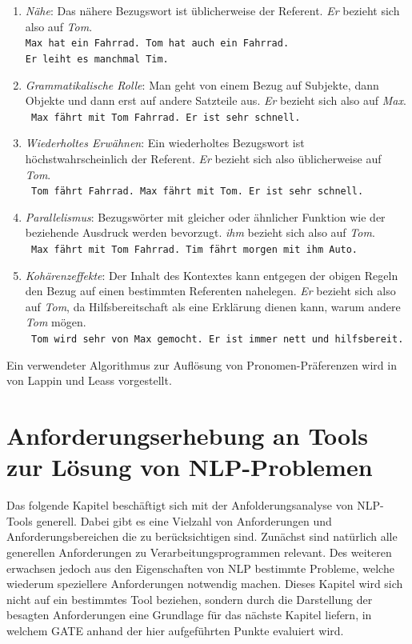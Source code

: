 \documentclass[12pt]{report}
\begin{document}
\begin{enumerate}
\item \textit{Nähe}: Das nähere Bezugswort ist üblicherweise der Referent. \textit{\glqq  Er\grqq{}} bezieht sich also auf \textit{Tom}.\\
\tt Max hat ein Fahrrad. Tom hat auch ein Fahrrad. \\Er leiht es manchmal Tim.
\rm
\item \textit{Grammatikalische Rolle}: Man geht von einem Bezug auf Subjekte, dann Objekte und dann erst auf andere Satzteile aus. \textit{\glqq  Er\grqq{}} bezieht sich also auf \textit{Max}.\\
\tt
Max fährt mit Tom Fahrrad. Er ist sehr schnell.
\rm
\item \textit{Wiederholtes Erwähnen}: Ein wiederholtes Bezugswort ist höchstwahrscheinlich der Referent. \textit{\glqq  Er\grqq{}} bezieht sich also üblicherweise auf \textit{Tom}.\\
\tt
Tom fährt Fahrrad. Max fährt mit Tom. Er ist sehr schnell.
\rm
\item \textit{Parallelismus}: Bezugswörter mit gleicher oder ähnlicher Funktion wie der beziehende Ausdruck werden bevorzugt. \textit{\glqq  ihm\grqq{}} bezieht sich also auf \textit{Tom}. \\
\tt
Max fährt mit Tom Fahrrad. Tim fährt morgen mit ihm Auto.
\rm
\item \textit{Kohärenzeffekte}: Der Inhalt des Kontextes kann entgegen der obigen Regeln den Bezug auf einen bestimmten Referenten nahelegen. \textit{\glqq  Er\grqq{}} bezieht sich also auf \textit{Tom}, da Hilfsbereitschaft als eine Erklärung dienen kann, warum andere \textit{Tom} mögen.\\
\tt
Tom wird sehr von Max gemocht. Er ist immer nett und hilfsbereit.
\rm
\end{enumerate}
Ein verwendeter Algorithmus zur Auflösung von Pronomen-Präferenzen wird in \cite{ll94} von Lappin und Leass vorgestellt.\\

\chapter{Anforderungserhebung an Tools zur Lösung von NLP-Problemen}
Das folgende Kapitel beschäftigt sich mit der Anfolderungsanalyse von NLP-Tools generell. Dabei gibt es eine Vielzahl von Anforderungen und Anforderungsbereichen die zu berücksichtigen sind. Zunächst sind natürlich alle generellen Anforderungen zu Verarbeitungsprogrammen relevant. Des weiteren erwachsen jedoch aus den Eigenschaften von NLP bestimmte Probleme, welche wiederum speziellere Anforderungen notwendig machen. Dieses Kapitel wird sich nicht auf ein bestimmtes Tool beziehen, sondern durch die Darstellung der besagten Anforderungen eine Grundlage für das nächste Kapitel liefern, in welchem GATE anhand der hier aufgeführten Punkte evaluiert wird. 
\end{document}
